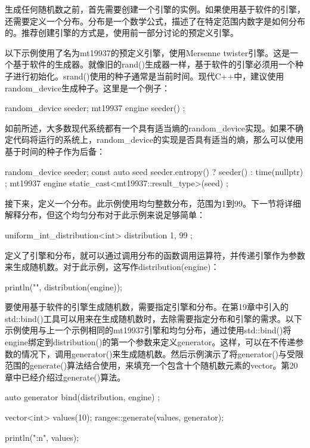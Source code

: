 生成任何随机数之前，首先需要创建一个引擎的实例。如果使用基于软件的引擎，还需要定义一个分布。分布是一个数学公式，描述了在特定范围内数字是如何分布的。推荐创建引擎的方式是，使用前一部分讨论的预定义引擎。

以下示例使用了名为mt19937的预定义引擎，使用Mersenne twister引擎。这是一个基于软件的生成器。就像旧的rand()生成器一样，基于软件的引擎必须用一个种子进行初始化。srand()使用的种子通常是当前时间。现代C++中，建议使用random\_device生成种子。这里是一个例子：

\begin{cpp}
random_device seeder;
mt19937 engine { seeder() };
\end{cpp}

如前所述，大多数现代系统都有一个具有适当熵的random\_device实现。如果不确定代码将运行的系统上，random\_device的实现是否具有适当的熵，那么可以使用基于时间的种子作为后备：

\begin{cpp}
random_device seeder;
const auto seed { seeder.entropy() ? seeder() : time(nullptr) };
mt19937 engine { static_cast<mt19937::result_type>(seed) };
\end{cpp}

接下来，定义一个分布。此示例使用均匀整数分布，范围为1到99。下一节将详细解释分布，但这个均匀分布对于此示例来说足够简单：

\begin{cpp}
uniform_int_distribution<int> distribution { 1, 99 };
\end{cpp}

定义了引擎和分布，就可以通过调用分布的函数调用运算符，并传递引擎作为参数来生成随机数。对于此示例，这写作distribution(engine)：

\begin{cpp}
println("{}", distribution(engine));
\end{cpp}

要使用基于软件的引擎生成随机数，需要指定引擎和分布。在第19章中引入的std::bind()工具可以用来在生成随机数时，去除需要指定分布和引擎的需求。以下示例使用与上一个示例相同的mt19937引擎和均匀分布，通过使用std::bind()将engine绑定到distribution()的第一个参数来定义generator。这样，可以在不传递参数的情况下，调用generator()来生成随机数。然后示例演示了将generator()与受限范围的generate()算法结合使用，来填充一个包含十个随机数元素的vector。第20章中已经介绍过generate()算法。

\begin{cpp}
auto generator { bind(distribution, engine) };

vector<int> values(10);
ranges::generate(values, generator);

println("{:n}", values);
\end{cpp}

